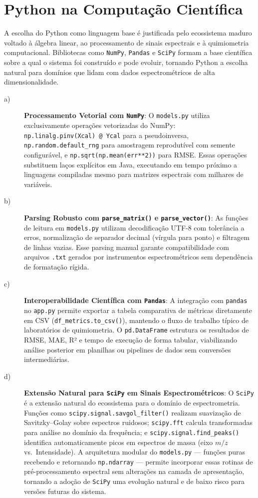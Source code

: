 \section{Python na Computação Científica}

A escolha do Python como linguagem base é justificada pelo ecossistema maduro voltado à
álgebra linear, ao processamento de sinais espectrais e à quimiometria computacional.
Bibliotecas como \texttt{NumPy}, \texttt{Pandas} e \texttt{SciPy} formam a base
científica sobre a qual o sistema foi construído e pode evoluir, tornando Python a
escolha natural para domínios que lidam com dados espectrométricos de alta
dimensionalidade.

\begin{description}

\item[a)] \textbf{Processamento Vetorial com \texttt{NumPy}}: O \texttt{models.py}
utiliza exclusivamente operações vetorizadas do NumPy:
\texttt{np.linalg.pinv(Xcal)~@~Ycal} para a pseudoinversa, \texttt{np.random.default\_rng}
para amostragem reprodutível com semente configurável, e \texttt{np.sqrt(np.mean(err**2))}
para RMSE. Essas operações substituem laços explícitos em Java, executando em tempo próximo
a linguagens compiladas mesmo para matrizes espectrais com milhares de variáveis.

\item[b)] \textbf{Parsing Robusto com \texttt{parse\_matrix()} e \texttt{parse\_vector()}}:
As funções de leitura em \texttt{models.py} utilizam decodificação UTF-8 com tolerância a
erros, normalização de separador decimal (vírgula para ponto) e filtragem de linhas
vazias. Esse parsing manual garante compatibilidade com arquivos \texttt{.txt} gerados
por instrumentos espectrométricos sem dependência de formatação rígida.

\item[c)] \textbf{Interoperabilidade Científica com \texttt{Pandas}}: A integração com
\texttt{pandas} no \texttt{app.py} permite exportar a tabela comparativa de métricas
diretamente em CSV (\texttt{df\_metrics.to\_csv()}), mantendo o fluxo de trabalho típico
de laboratórios de quimiometria. O \texttt{pd.DataFrame} estrutura os resultados de RMSE,
MAE, R² e tempo de execução de forma tabular, viabilizando análise posterior em planilhas
ou pipelines de dados sem conversões intermediárias.

\item[d)] \textbf{Extensão Natural para \texttt{SciPy} em Sinais Espectrométricos}: O
\texttt{SciPy} é a extensão natural do ecossistema para o domínio de espectrometria.
Funções como \texttt{scipy.signal.savgol\_filter()} realizam suavização de Savitzky--Golay
sobre espectros ruidosos; \texttt{scipy.fft} calcula transformadas para análise no domínio
da frequência; e \texttt{scipy.signal.find\_peaks()} identifica automaticamente picos em
espectros de massa (eixo $m/z$ vs.\ Intensidade). A arquitetura modular do
\texttt{models.py} — funções puras recebendo e retornando \texttt{np.ndarray} — permite
incorporar essas rotinas de pré-processamento espectral sem alterações na camada de
apresentação, tornando a adoção de \texttt{SciPy} uma evolução natural e de baixo risco
para versões futuras do sistema.


\end{description}
